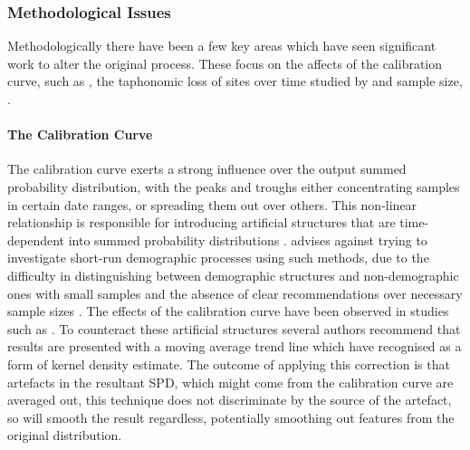 \subsubsection{Methodological Issues}
Methodologically there have been a few key areas which have seen significant work to alter the original process. These focus on the affects of the calibration curve, such as \citet{BROWN2015133}, the taphonomic loss of sites over time studied by\citet{SUROVELL20071868,SUROVELL20091715} and sample size, \citet{Williams2012578}.

\paragraph{The Calibration Curve}
The calibration curve exerts a strong influence over the output summed probability distribution, with the peaks and troughs either concentrating samples in certain date ranges, or spreading them out over others. This non-linear relationship is responsible for introducing artificial structures that are time-dependent into summed probability distributions \citep[141]{BROWN2015133}. \citet{BROWN2015133} advises against trying to investigate short-run demographic processes using such methods, due to the difficulty in distinguishing between demographic structures and non-demographic ones with small samples and the absence of clear recommendations over necessary sample sizes \citep[142]{BROWN2015133}. The effects of the calibration curve have been observed in studies such as \citet[137]{McLaughlin2016}. To counteract these artificial structures several authors recommend that results are presented with a moving average trend line \citep[584]{Williams2012578} which \citet[143]{BROWN2015133} have recognised as a form of kernel density estimate. The outcome of applying this correction is that artefacts in the resultant SPD, which might come from the calibration curve are averaged out, this technique does not discriminate by the source of the artefact, so will smooth the result regardless, potentially smoothing out features from the original distribution.

